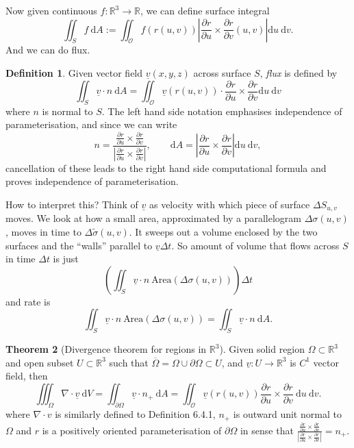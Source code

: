 \documentclass[a4paper]{article}
\theoremstyle{definition}
\newtheorem{defn}{Definition}[subsection]
\newtheorem{thm}[defn]{Theorem}
\begin{document}
Now given continuous $f:\mathbb R^3 \rightarrow \mathbb R$, we can define surface integral
\[
\iint_S f \ \mathrm d A := \iint_{\mathcal O} f(r(u,v)) \left| \frac{\partial r}{\partial u} \times \frac{\partial r}{\partial v} (u,v) \right|  \mathrm d u \ \mathrm d v .
\]
And we can do flux.
\begin{defn}
Given vector field $\underline v (x,y,z)$ across surface $S$, \textit{flux} is defined by
\[
\iint_S \underline v \cdot n \ \mathrm d A = \iint_{\mathcal O} \underline v (r(u,v)) \cdot \frac{\partial r}{\partial u} \times \frac{\partial r}{\partial v}  \mathrm d u \ \mathrm d v
\]
where $n$ is normal to $S$. The left hand side notation emphasises independence of parameterisation, and since we can write
\[
n=\frac{\frac{\partial r}{\partial u} \times \frac{\partial r}{\partial v}}{\left|\frac{\partial r}{\partial u} \times \frac{\partial r}{\partial v}\right|},\qquad \mathrm d A = \left|\frac{\partial r}{\partial u} \times \frac{\partial r}{\partial v}\right| \mathrm d u \ \mathrm d v,
\]
cancellation of these leads to the right hand side computational formula and proves independence of parameterisation.
\end{defn}
How to interpret this? Think of $\underline v$ as velocity with which piece of surface $\Delta S_{u,v}$ moves. We look at how a small area, approximated by a parallelogram $\Delta \sigma (u,v)$, moves in time to $\Delta \tilde{\sigma}(u,v).$ It sweeps out a volume enclosed by the two surfaces and the ``walls'' parallel to $\underline v \Delta t$. So amount of volume that flows across $S$ in time $\Delta t$ is just
\[
\left(\iint_{S} \underline v \cdot n \ \text{Area}(\Delta \sigma (u,v)) \right)\Delta t
\]
and rate is
\[
\iint_{S} \underline v \cdot n \ \text{Area}(\Delta \sigma (u,v)) = \iint_S \underline v \cdot n \ \mathrm d A.
\]

\begin{thm}[Divergence theorem for regions in $\mathbb R^3$]
Given solid region $\Omega \subset \mathbb R^3$ and open subset $U\subset \mathbb R^3$ such that $\overline{\Omega}=\Omega \cup \partial \Omega \subset U$, and $\underline v:U\rightarrow \mathbb R^3$ is $C^1$ vector field, then
\[
\iiint_\Omega \nabla \cdot \underline v \ \mathrm d V = \iint_{\partial \Omega} \underline v \cdot n_+ \ \mathrm d A = \iint_{\mathcal O} \underline v (r(u,v)) \frac{\partial r}{\partial u} \times \frac{\partial r}{\partial v} \ \mathrm d u \ \mathrm d v.
\]
where $\nabla \cdot v$ is similarly defined to Definition 6.4.1, $n_+$ is outward unit normal to $\Omega$ and $r$ is a positively oriented parameterisation of $\partial \Omega$ in sense that $\frac{\frac{\partial r}{\partial u} \times \frac{\partial r}{\partial v}}{\left|\frac{\partial r}{\partial u} \times \frac{\partial r}{\partial v}\right|} = n_+$.
\end{thm}
\end{document}
